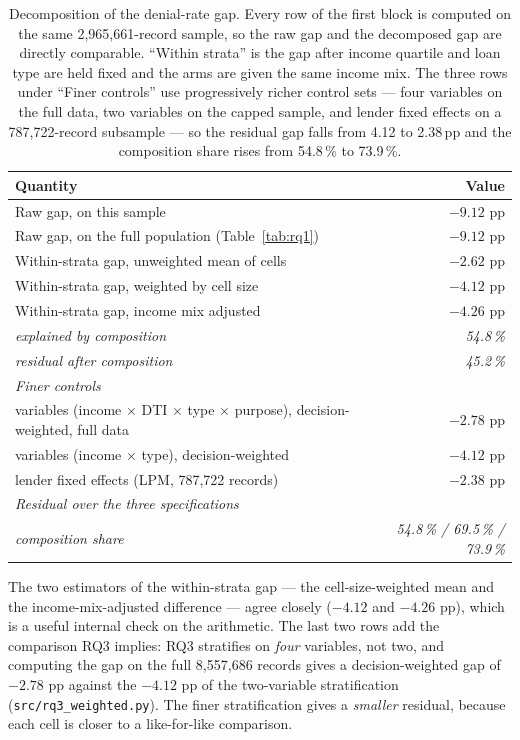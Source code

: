 \documentclass[sigconf,balance=false]{acmart}
\begin{document}
\begin{table}[t]
\caption{Decomposition of the denial-rate gap. Every row of the first block
         is computed on the same 2{,}965{,}661-record sample, so the raw gap
         and the decomposed gap are directly comparable. ``Within strata''
         is the gap after income quartile and loan type are held fixed and
         the arms are given the same income mix. The three rows under
         ``Finer controls'' use progressively richer control sets --- four
         variables on the full data, two variables on the capped sample,
         and lender fixed effects on a 787{,}722-record subsample --- so the
         residual gap falls from 4.12 to 2.38\,pp and the composition share
         rises from 54.8\,\% to 73.9\,\%.}
\label{tab:decomp}
\centering
\begin{tabular}{@{}p{}r@{}}
\toprule
Quantity & Value \\
\midrule
Raw gap, on this sample                       & $-9.12$ pp \\
Raw gap, on the full population (Table~\ref{tab:rq1}) & $-9.12$ pp \\
Within-strata gap, unweighted mean of cells   & $-2.62$ pp \\
Within-strata gap, weighted by cell size      & $\mathbf{-4.12}$ pp \\
Within-strata gap, income mix adjusted        & $-4.26$ pp \\
\quad\emph{explained by composition}          & \emph{54.8\,\%} \\
\quad\emph{residual after composition}        & \emph{45.2\,\%} \\
\midrule
\emph{Finer controls} & \\
\quad 4 variables (income $\times$ DTI $\times$ type $\times$ purpose),
      decision-weighted, full data & $-2.78$ pp \\
\quad 2 variables (income $\times$ type), decision-weighted & $-4.12$ pp \\
\quad lender fixed effects (LPM, 787{,}722 records) & $-2.38$ pp \\
\midrule
\emph{Residual over the three specifications} & \\
\quad\emph{composition share} & \emph{54.8\,\% / 69.5\,\% / 73.9\,\%} \\
\bottomrule
\end{tabular}
\end{table}

The two estimators of the within-strata gap --- the cell-size-weighted mean
and the income-mix-adjusted difference --- agree closely ($-4.12$ and
$-4.26$ pp), which is a useful internal check on the arithmetic. The last
two rows add the comparison RQ3 implies: RQ3 stratifies on \emph{four}
variables, not two, and computing the gap on the full 8{,}557{,}686 records
gives a decision-weighted gap of $-2.78$ pp against the $-4.12$ pp of the
two-variable stratification (\texttt{src/rq3\_\allowbreak weighted.py}). The
finer stratification gives a \emph{smaller} residual, because each cell is
closer to a like-for-like comparison.
\end{document}
